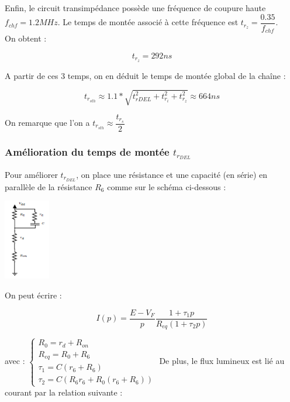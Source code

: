 \documentclass[a4paper]{report}
\begin{document}
Enfin, le circuit transimpédance possède une fréquence de coupure haute $f_{chf} = 1.2MHz$. Le temps de montée associé à cette fréquence est $t_{r_{z}} = \dfrac{0.35}{f_{chf}}$.\\

On obtent :

$$t_{r_{z}} = 292ns$$

A partir de ces 3 temps, on en déduit le temps de montée global de la chaîne :

$$t_{r_{sth}} \approx 1.1*\sqrt{t_{rDEL}^2 + t_{r_{i}}^2 + t_{r_{z}}^2} \approx 664ns$$

On remarque que l'on a $t_{r_{sth}} \approx \dfrac{t_{r_{s}}}{2}$

\subsubsection{Amélioration du temps de montée $t_{r_{DEL}}$}

Pour améliorer $t_{r_{DEL}}$, on place une résistance et une capacité (en série) en parallèle de la résistance $R_6$ comme sur le schéma ci-dessous :

\begin{center}
\includegraphics[width=0.15\textwidth]{montage_amelio_trdel.PNG}
\end{center}

On peut écrire :

$$I(p) = \dfrac{E-V_F}{p}\dfrac{1+\tau_1p}{R_{eq}(1+\tau_2p)}$$

avec :
\newline
\newline
$\left\{
\begin{array}{l}
  R_0 = r_d + R_{on}\\
  R_{eq} = R_0 + R_6\\
  \tau_1 = C(r_6+R_6)\\
  \tau_2 = C(R_6r_6 + R_0(r_6+R_6))
\end{array}
\right.$
\newline
\newline
De plus, le flux lumineux est lié au courant par la relation suivante : 
\end{document}
